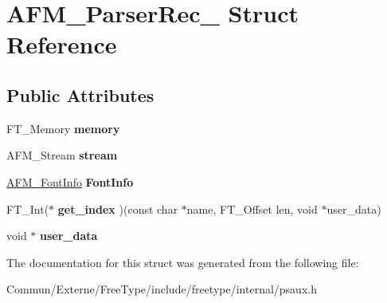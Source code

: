\hypertarget{struct_a_f_m___parser_rec__}{}\section{A\+F\+M\+\_\+\+Parser\+Rec\+\_\+ Struct Reference}
\label{struct_a_f_m___parser_rec__}
\subsection*{Public Attributes}
\begin{DoxyCompactItemize}
\item 
F\+T\+\_\+\+Memory {\bfseries memory}\hypertarget{struct_a_f_m___parser_rec___a3fec8b1760fa9261f48ee87dc2b3858b}{}\label{struct_a_f_m___parser_rec___a3fec8b1760fa9261f48ee87dc2b3858b}

\item 
A\+F\+M\+\_\+\+Stream {\bfseries stream}\hypertarget{struct_a_f_m___parser_rec___adf3b1165216cbd1f7ec7ae736fd4270a}{}\label{struct_a_f_m___parser_rec___adf3b1165216cbd1f7ec7ae736fd4270a}

\item 
\hyperlink{struct_a_f_m___font_info_rec__}{A\+F\+M\+\_\+\+Font\+Info} {\bfseries Font\+Info}\hypertarget{struct_a_f_m___parser_rec___ae53d6cddac32a0eb7014c3a9f74517df}{}\label{struct_a_f_m___parser_rec___ae53d6cddac32a0eb7014c3a9f74517df}

\item 
F\+T\+\_\+\+Int($\ast$ {\bfseries get\+\_\+index} )(const char $\ast$name, F\+T\+\_\+\+Offset len, void $\ast$user\+\_\+data)\hypertarget{struct_a_f_m___parser_rec___a9d33b62410351d72878f0f14007e7385}{}\label{struct_a_f_m___parser_rec___a9d33b62410351d72878f0f14007e7385}

\item 
void $\ast$ {\bfseries user\+\_\+data}\hypertarget{struct_a_f_m___parser_rec___a9fa78a781737bf27e00448c5092b7657}{}\label{struct_a_f_m___parser_rec___a9fa78a781737bf27e00448c5092b7657}

\end{DoxyCompactItemize}


The documentation for this struct was generated from the following file\+:\begin{DoxyCompactItemize}
\item 
Commun/\+Externe/\+Free\+Type/include/freetype/internal/psaux.\+h\end{DoxyCompactItemize}
